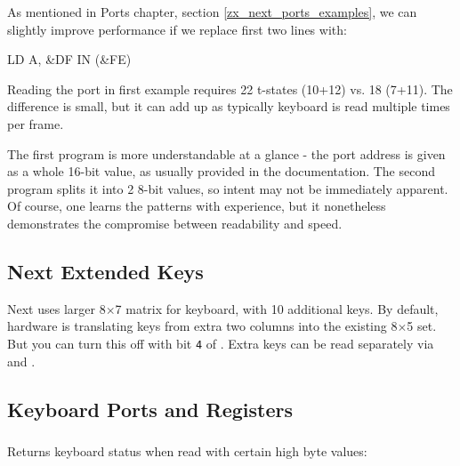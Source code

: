 As mentioned in Ports chapter, section \ref{zx_next_ports_examples}, we can slightly improve performance if we replace first two lines with:

\begin{tcblisting}{}
	LD A, &DF
	IN (&FE)
\end{tcblisting}

Reading the port in first example requires 22 t-states (10+12) vs. 18 (7+11). The difference is small, but it can add up as typically keyboard is read multiple times per frame.

The first program is more understandable at a glance - the port address is given as a whole 16-bit value, as usually provided in the documentation. The second program splits it into 2 8-bit values, so intent may not be immediately apparent. Of course, one learns the patterns with experience, but it nonetheless demonstrates the compromise between readability and speed.


\subsection{Next Extended Keys}

Next uses larger 8$\times$7 matrix for keyboard, with 10 additional keys. By default, hardware is translating keys from extra two columns into the existing 8$\times$5 set. But you can turn this off with bit {\tt 4} of . Extra keys can be read separately via  and .


\subsection{Keyboard Ports and Registers}
\label{zx_next_keyboard_registers}

\subsubsection{}

\vspace*{-1em} %
Returns keyboard status when read with certain high byte values:

